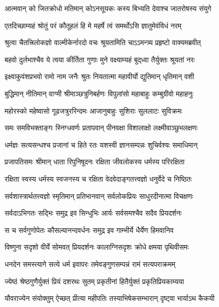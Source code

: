 \twolineshloka
{आत्मवान् को जितक्रोधो मतिमान् कोऽनसूयकः}
{कस्य बिभ्यति देवाश्च जातरोषस्य संयुगे}%

\twolineshloka
{एतदिच्छाम्यहं श्रोतुं परं कौतूहलं हि मे}
{महर्षे त्वं समर्थोऽसि ज्ञातुमेवंविधं नरम्}%

\twolineshloka
{श्रुत्वा चैतत्त्रिलोकज्ञो वाल्मीकेर्नारदो वचः}
{श्रूयतामिति चाऽऽमन्त्र्य प्रहृष्टो वाक्यमब्रवीत्}%

\twolineshloka
{बहवो दुर्लभाश्चैव ये त्वया कीर्तिता गुणाः}
{मुने वक्ष्याम्यहं बुद्‌ध्वा तैर्युक्तः श्रूयतां नरः}%

\twolineshloka
{इक्ष्वाकुवंशप्रभवो रामो नाम जनैः श्रुतः}
{नियतात्मा महावीर्यो द्युतिमान् धृतिमान् वशी}%

\twolineshloka
{बुद्धिमान् नीतिमान् वाग्मी श्रीमाञ्छत्रुनिबर्हणः}
{विपुलांसो महाबाहुः कम्बुग्रीवो महाहनुः}%

\twolineshloka
{महोरस्को महेष्वासो गूढजत्रुररिन्दमः}
{आजानुबाहुः सुशिराः सुललाटः सुविक्रमः}%

\twolineshloka
{समः समविभक्ताङ्गः स्निग्धवर्णः प्रतापवान्}
{पीनवक्षा विशालाक्षो लक्ष्मीवाञ्छुभलक्षणः}%

\twolineshloka
{धर्मज्ञः सत्यसन्धश्च प्रजानां च हिते रतः}
{यशस्वी ज्ञानसम्पन्नः शुचिर्वश्यः समाधिमान्}%

\twolineshloka
{प्रजापतिसमः श्रीमान् धाता रिपुनिषूदनः}
{रक्षिता जीवलोकस्य धर्मस्य परिरक्षिता}%

\twolineshloka
{रक्षिता स्वस्य धर्मस्य स्वजनस्य च रक्षिता}
{वेदवेदाङ्गतत्त्वज्ञो धनुर्वेदे च निष्ठितः}%

\twolineshloka
{सर्वशास्त्रार्थतत्त्वज्ञो स्मृतिमान् प्रतिभानवान्}
{सर्वलोकप्रियः साधुरदीनात्मा विचक्षणः}%

\twolineshloka
{सर्वदाऽभिगतः सद्भिः समुद्र इव सिन्धुभिः}
{आर्यः सर्वसमश्चैव सदैव प्रियदर्शनः}%

\twolineshloka
{स च सर्वगुणोपेतः कौसल्यानन्दवर्धनः}
{समुद्र इव गाम्भीर्ये धैर्येण हिमवानिव}%

\twolineshloka
{विष्णुना सदृशो वीर्ये सोमवत् प्रियदर्शनः}
{कालाग्निसदृशः क्रोधे क्षमया पृथिवीसमः}%

\twolineshloka
{धनदेन समस्त्यागे सत्ये धर्म इवापरः}
{तमेवङ्गुणसम्पन्नं रामं सत्यपराक्रमम्}%

\twolineshloka
{ज्येष्ठं श्रेष्ठगुणैर्युक्तं प्रियं दशरथः सुतम्}
{प्रकृतीनां हितैर्युक्तं प्रकृतिप्रियकाम्यया}%

\twolineshloka
{यौवराज्येन संयोक्तुम् ऐच्छत् प्रीत्या महीपतिः}
{तस्याभिषेकसम्भारान् दृष्ट्वा भार्याऽथ कैकयी}%

